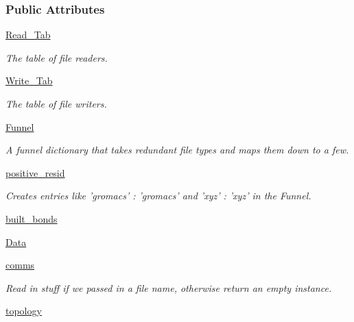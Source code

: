 \subsubsection*{\-Public \-Attributes}
\begin{DoxyCompactItemize}
\item 
\hyperlink{classforcebalance_1_1molecule_1_1Molecule_ab812bbb4ae25ee4f6b69a7926a2ef3e8}{\-Read\-\_\-\-Tab}
\begin{DoxyCompactList}\small\item\em \-The table of file readers. \end{DoxyCompactList}\item 
\hyperlink{classforcebalance_1_1molecule_1_1Molecule_a950a2ec0b5697bf88f192dec676825fc}{\-Write\-\_\-\-Tab}
\begin{DoxyCompactList}\small\item\em \-The table of file writers. \end{DoxyCompactList}\item 
\hyperlink{classforcebalance_1_1molecule_1_1Molecule_a8ee3f691f4ff9c4236afa756ed5482e3}{\-Funnel}
\begin{DoxyCompactList}\small\item\em \-A funnel dictionary that takes redundant file types and maps them down to a few. \end{DoxyCompactList}\item 
\hyperlink{classforcebalance_1_1molecule_1_1Molecule_a5ba227fb037995246be7bca5cf633b8b}{positive\-\_\-resid}
\begin{DoxyCompactList}\small\item\em \-Creates entries like 'gromacs' \-: 'gromacs' and 'xyz' \-: 'xyz' in the \-Funnel. \end{DoxyCompactList}\item 
\hyperlink{classforcebalance_1_1molecule_1_1Molecule_aa0768b07267ac7def14dd5224caa5708}{built\-\_\-bonds}
\item 
\hyperlink{classforcebalance_1_1molecule_1_1Molecule_a8698f94608be34eeba6eaa4c52dc5249}{\-Data}
\item 
\hyperlink{classforcebalance_1_1molecule_1_1Molecule_a5e092c726455a18c9300f5c5362121d8}{comms}
\begin{DoxyCompactList}\small\item\em \-Read in stuff if we passed in a file name, otherwise return an empty instance. \end{DoxyCompactList}\item 
\hyperlink{classforcebalance_1_1molecule_1_1Molecule_accabf9159aa7f3c6e514ec048d88eeaa}{topology}

\end{DoxyCompactItemize}
